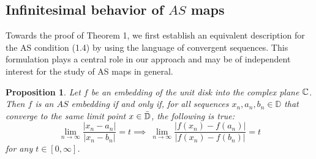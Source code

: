 \documentclass[11pt]{amsart}
\numberwithin{equation}{section}
\theoremstyle{plain}
\newtheorem{pro}{Proposition}
\theoremstyle{step}
\newcommand{\abs}[1]{\lvert#1\rvert}
\newcommand{\D}{\mathbb{D}}
\newcommand{\Dc}{\Bar{\Bbb{D}}}
\newcommand{\C}{\Bbb{C}}
\begin{document}
\subsection{Infinitesimal behavior of $AS$ maps}
Towards the proof of Theorem 1, we first establish an equivalent description for the AS condition (1.4) by using the language of convergent sequences. This formulation plays a central role in our approach and may be of independent interest for the study of AS maps in general. 
\begin{pro}\label{proposition:sequences_AS}
    Let $f$ be an embedding of the unit disk into the complex plane $\C$. Then $f$ is an $AS$ embedding if and only if, for all sequences $x_n,a_n,b_n\in\D$ that converge to the same limit point $x\in\Dc$, the following is true: 
    \begin{equation}
    \lim_{n\rightarrow\infty}\frac{\abs{x_n-a_n}}{\abs{x_n-b_n}}= t \implies \ \lim_{n\rightarrow\infty} \frac{\abs{f(x_n)-f(a_n)}}{\abs{f(x_n)-f(b_n)}}=t
    \end{equation}
for any $t\in [0,\infty]$.
\end{pro}
\end{document}
